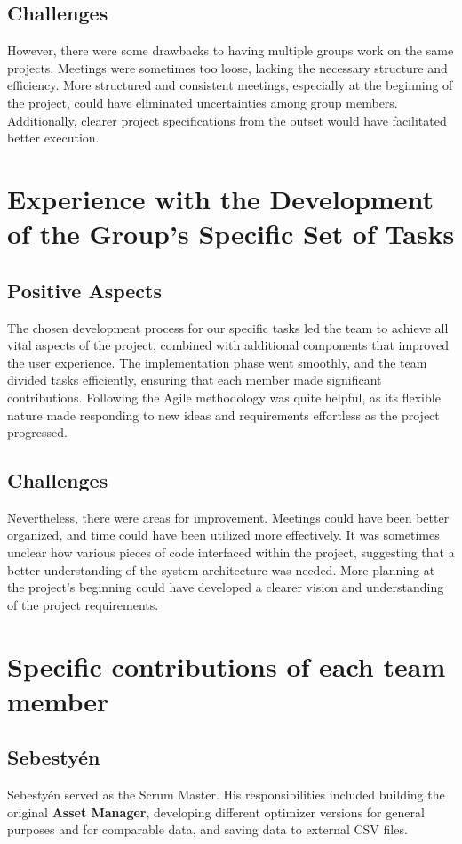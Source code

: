\documentclass[12pt]{report}
\begin{document}
\subsection*{Challenges}
However, there were some drawbacks to having multiple groups work on the same projects. 
Meetings were sometimes too loose, lacking the necessary structure and efficiency. 
More structured and consistent meetings, especially at the beginning of the project, could have eliminated 
uncertainties among group members. Additionally, clearer project specifications from the outset would have 
facilitated better execution.

\section{Experience with the Development of the Group's Specific Set of Tasks}

\subsection*{Positive Aspects}
The chosen development process for our specific tasks led the team to achieve all vital aspects of the project, 
combined with additional components that improved the user experience. The implementation phase went smoothly, 
and the team divided tasks efficiently, ensuring that each member made significant contributions. Following the 
Agile methodology was quite helpful, as its flexible nature made responding to new ideas and requirements 
effortless as the project progressed.

\subsection*{Challenges}
Nevertheless, there were areas for improvement. Meetings could have been better organized, and 
time could have been utilized more effectively. It was sometimes unclear how various pieces of code interfaced 
within the project, suggesting that a better understanding of the system architecture was needed. 
More planning at the project's beginning could have developed a clearer vision and understanding of the project requirements.

\section{Specific contributions of each team member}

\subsection*{Sebestyén}
Sebestyén served as the Scrum Master. His responsibilities included building the original \textbf{Asset Manager}, 
developing different optimizer versions for general purposes and for comparable data, and saving data to external CSV files.
\end{document}
